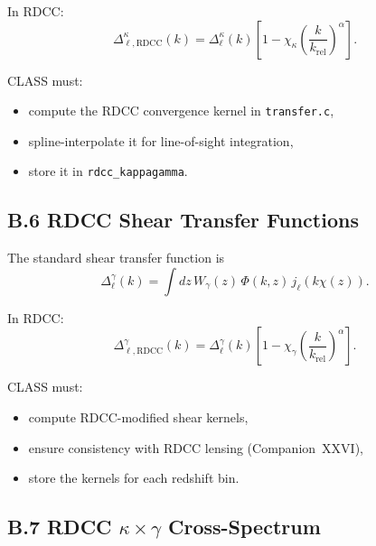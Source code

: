 \documentclass[11pt,a4paper]{article}
\begin{document}
In RDCC:
\begin{equation}
    \Delta_{\ell,\mathrm{RDCC}}^{\kappa}(k)
    = \Delta_{\ell}^{\kappa}(k)
      \left[
        1 - \chi_{\kappa}
        \left(\frac{k}{k_{\mathrm{rel}}}\right)^{\alpha}
      \right].
\end{equation}

CLASS must:

\begin{itemize}
    \item compute the RDCC convergence kernel in \texttt{transfer.c},
    \item spline-interpolate it for line-of-sight integration,
    \item store it in \texttt{rdcc\_kappagamma}.
\end{itemize}

\subsection*{B.6 RDCC Shear Transfer Functions}

The standard shear transfer function is
\begin{equation}
    \Delta_{\ell}^{\gamma}(k)
    = \int dz\,
      W_{\gamma}(z)\,
      \Phi(k,z)\,
      j_{\ell}(k\chi(z)).
\end{equation}

In RDCC:
\begin{equation}
    \Delta_{\ell,\mathrm{RDCC}}^{\gamma}(k)
    = \Delta_{\ell}^{\gamma}(k)
      \left[
        1 - \chi_{\gamma}
        \left(\frac{k}{k_{\mathrm{rel}}}\right)^{\alpha}
      \right].
\end{equation}

CLASS must:

\begin{itemize}
    \item compute RDCC-modified shear kernels,
    \item ensure consistency with RDCC lensing (Companion~XXVI),
    \item store the kernels for each redshift bin.
\end{itemize}

\subsection*{B.7 RDCC $\kappa \times \gamma$ Cross-Spectrum}
\end{document}
